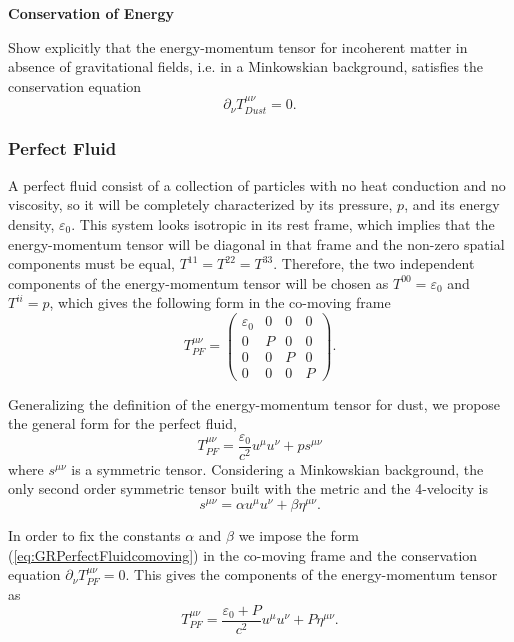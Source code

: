 \begin{exercise}
\textbf{Conservation of Energy}

Show explicitly that the energy-momentum tensor for incoherent matter in absence of gravitational fields, i.e. in a Minkowskian background, satisfies the conservation equation
\begin{equation}
 \partial_\nu T^{\mu \nu} _{Dust} = 0.
\end{equation}
\end{exercise}

\subsubsection{Perfect Fluid}
A perfect fluid consist of a collection of particles with no heat conduction and no viscosity, so it will be completely characterized by its pressure, $p$, and its energy density, $\varepsilon_0$. This system looks isotropic in its rest frame, which implies that the energy-momentum tensor will be diagonal in that frame and the non-zero spatial components must be equal, $T^{11} = T^{22} = T^{33}$. Therefore, the two independent components of the energy-momentum tensor will be chosen as $T^{00} = \varepsilon_0$ and $T^{ii} = p$, which gives the following form in the co-moving frame
\begin{equation}
T^{\mu\nu}_{PF}=\left(\begin{array}{cccc}
\varepsilon_{0} & 0 & 0 & 0\\
0 & P & 0 & 0\\
0 & 0 & P & 0\\
0 & 0 & 0 & P
\end{array}\right). \label{eq:GRPerfectFluidcomoving}
\end{equation}

Generalizing the definition of the energy-momentum tensor for dust, we propose the general form for the perfect fluid,
\begin{equation}
T_{PF}^{\mu\nu}=\frac{\varepsilon_{0}}{c^{2}}u^{\mu}u^{\nu} + p s^{\mu \nu} 
\end{equation}
where $ s^{\mu \nu} $ is a symmetric tensor. Considering a Minkowskian background, the only second order symmetric tensor built with the metric and the 4-velocity is
\begin{equation}
s^{\mu \nu} = \alpha u^\mu u^\nu + \beta \eta^{\mu \nu}.
\end{equation}

In order to fix the constants $\alpha$ and $\beta$ we impose the form (\ref{eq:GRPerfectFluidcomoving}) in the co-moving frame and the conservation equation $\partial_\nu T^{\mu \nu} _{PF} = 0$. This gives the components of the energy-momentum tensor as 
\begin{equation}
T_{PF}^{\mu\nu}=\frac{\varepsilon_{0}+P}{c^{2}}u^{\mu}u^{\nu}+P\eta^{\mu\nu}. 
\end{equation}


